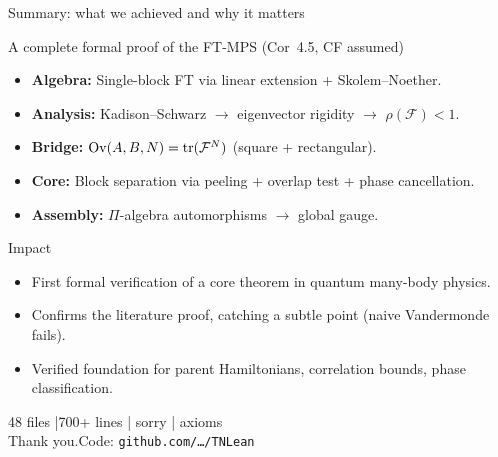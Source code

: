 \documentclass[aspectratio=169,10pt]{beamer}
\newcommand{\cF}{\mathcal{F}}
\newcommand{\Ov}{\mathrm{Ov}}
\begin{document}
\begin{frame}{Summary: what we achieved and why it matters}
    \vspace{-0.6em}

    \begin{block}{A complete formal proof of the FT-MPS (Cor~4.5, CF assumed)}
        \begin{itemize}\itemsep0.2em
            \item \textbf{Algebra:} Single-block FT via linear extension + Skolem--Noether.
            \item \textbf{Analysis:} Kadison--Schwarz $\to$ eigenvector rigidity $\to$ $\rho(\cF)<1$.
            \item \textbf{Bridge:} $\Ov(A,B,N) = \tr(\cF^N)$ (square + rectangular).
            \item \textbf{Core:} Block separation via peeling + overlap test + phase cancellation.
            \item \textbf{Assembly:} $\Pi$-algebra automorphisms $\to$ global gauge.
        \end{itemize}
    \end{block}

    \begin{block}{Impact}
        \begin{itemize}\itemsep0.15em
            \item \alert{First formal verification} of a core theorem in quantum many-body physics.
            \item Confirms the literature proof, catching a subtle point (naive Vandermonde fails).
            \item Verified foundation for parent Hamiltonians, correlation bounds, phase classification.
        \end{itemize}
    \end{block}

    \vspace{0.3em}
    \begin{center}
        \textcolor{leangreen}{\footnotesize 48 files \quad|700+ lines \quad| sorry \quad| axioms}
        \\[0.2em]
        \textcolor{dimwhite}{\footnotesize Thank you.\quad Code: \texttt{github.com/\ldots/TNLean}}
    \end{center}
\end{frame}

\appendix
\end{document}
